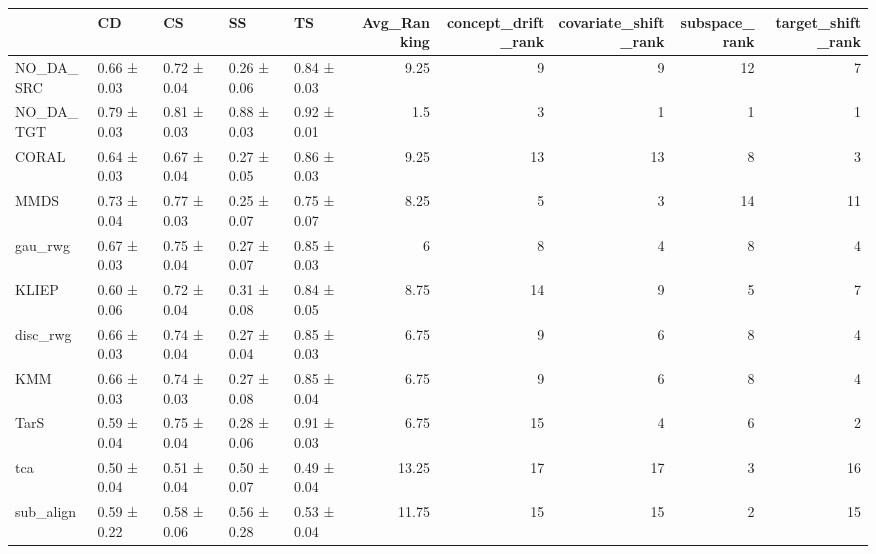 \begin{tabular}{lllllrrrrr}
\hline
           & CD          & CS          & SS          & TS          &   Avg\_Ranking &   concept\_drift\_rank &   covariate\_shift\_rank &   subspace\_rank &   target\_shift\_rank \\
\hline
 NO\_DA\_SRC & 0.66 ± 0.03 & 0.72 ± 0.04 & 0.26 ± 0.06 & 0.84 ± 0.03 &          9.25 &                    9 &                      9 &              12 &                   7 \\
 NO\_DA\_TGT & 0.79 ± 0.03 & 0.81 ± 0.03 & 0.88 ± 0.03 & 0.92 ± 0.01 &          1.5  &                    3 &                      1 &               1 &                   1 \\
 CORAL     & 0.64 ± 0.03 & 0.67 ± 0.04 & 0.27 ± 0.05 & 0.86 ± 0.03 &          9.25 &                   13 &                     13 &               8 &                   3 \\
 MMDS      & 0.73 ± 0.04 & 0.77 ± 0.03 & 0.25 ± 0.07 & 0.75 ± 0.07 &          8.25 &                    5 &                      3 &              14 &                  11 \\
 gau\_rwg   & 0.67 ± 0.03 & 0.75 ± 0.04 & 0.27 ± 0.07 & 0.85 ± 0.03 &          6    &                    8 &                      4 &               8 &                   4 \\
 KLIEP     & 0.60 ± 0.06 & 0.72 ± 0.04 & 0.31 ± 0.08 & 0.84 ± 0.05 &          8.75 &                   14 &                      9 &               5 &                   7 \\
 disc\_rwg  & 0.66 ± 0.03 & 0.74 ± 0.04 & 0.27 ± 0.04 & 0.85 ± 0.03 &          6.75 &                    9 &                      6 &               8 &                   4 \\
 KMM       & 0.66 ± 0.03 & 0.74 ± 0.03 & 0.27 ± 0.08 & 0.85 ± 0.04 &          6.75 &                    9 &                      6 &               8 &                   4 \\
 TarS      & 0.59 ± 0.04 & 0.75 ± 0.04 & 0.28 ± 0.06 & 0.91 ± 0.03 &          6.75 &                   15 &                      4 &               6 &                   2 \\
 tca       & 0.50 ± 0.04 & 0.51 ± 0.04 & 0.50 ± 0.07 & 0.49 ± 0.04 &         13.25 &                   17 &                     17 &               3 &                  16 \\
 sub\_align & 0.59 ± 0.22 & 0.58 ± 0.06 & 0.56 ± 0.28 & 0.53 ± 0.04 &         11.75 &                   15 &                     15 &               2 &                  15 \\

\end{tabular}
